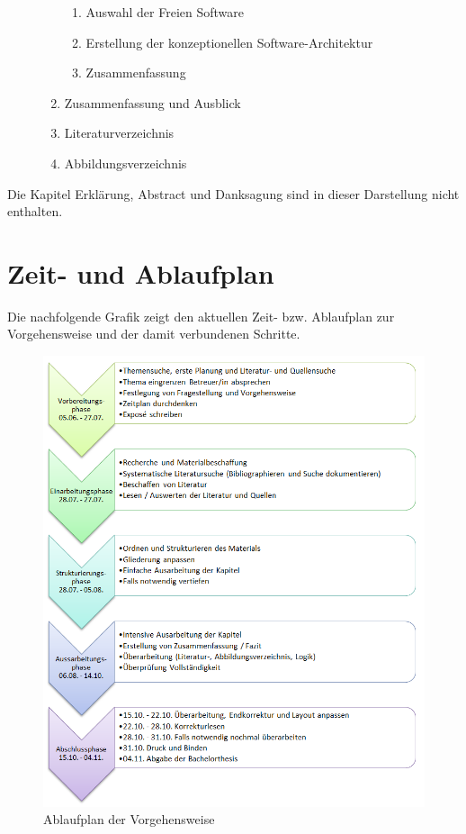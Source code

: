 \begin{center}
\begin{description}
\begin{enumerate}
\begin{enumerate}
      		\item Auswahl der Freien Software
		\item Erstellung der konzeptionellen Software-Architektur
		\item Zusammenfassung
      \end{enumerate}
      \item Zusammenfassung und Ausblick   
      \item Literaturverzeichnis
      \item Abbildungsverzeichnis
    \end{enumerate} 		
\end{description}	
\end{center}

Die Kapitel Erklärung, Abstract und Danksagung sind in dieser Darstellung nicht enthalten.

\section{Zeit- und Ablaufplan}
\label{ch:FreieSoftware:sec:Ablaufplan}
  
Die nachfolgende Grafik zeigt den aktuellen Zeit- bzw. Ablaufplan zur Vorgehensweise und der damit verbundenen Schritte.

\begin{figure}[H]
 \centering
 \includegraphics[scale=0.59]{images/Ablaufplan_BA.png}
 \caption{Ablaufplan der Vorgehensweise}
 \label{fig:Ablaufplan-BA}
\end{figure}


